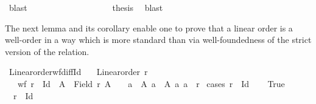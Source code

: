 \begin{isabellebody}
\ blast\isanewline
\ \ \ \ \ \ \isamarkupfalse%
\isanewline
\ \ \ \ \isamarkupfalse%
\isanewline
\ \ \isamarkupfalse%
\isanewline
\ \ \isamarkupfalse%
\ \isamarkupfalse%
\ {\isacharquery}{\kern0pt}thesis\ \isamarkupfalse%
\ blast\isanewline
{}\isamarkupfalse%
%
\endisatagproof
{\isafoldproof}%
%
\isadelimproof
%
\endisadelimproof
%
\isadelimdocument
%
\endisadelimdocument
%
\isatagdocument
%
\isamarkuptrue%
%
\endisatagdocument
{\isafolddocument}%
%
\isadelimdocument
%
\endisadelimdocument
%
\begin{isamarkuptext}%
The next lemma and its corollary enable one to prove that a linear order is
  a well-order in a way which is more standard than via well-foundedness of
  the strict version of the relation.%
\end{isamarkuptext}\isamarkuptrue%
\isamarkupfalse%
\ Linear{\isacharunderscore}{\kern0pt}order{\isacharunderscore}{\kern0pt}wf{\isacharunderscore}{\kern0pt}diff{\isacharunderscore}{\kern0pt}Id{\isacharcolon}{\kern0pt}\isanewline
\ \ \ {\isachardoublequoteopen}Linear{\isacharunderscore}{\kern0pt}order\ r{\isachardoublequoteclose}\isanewline
\ \ \ {\isachardoublequoteopen}wf\ {\isacharparenleft}{\kern0pt}r\ {\isacharminus}{\kern0pt}\ Id{\isacharparenright}{\kern0pt}\ {\isasymlongleftrightarrow}\ {\isacharparenleft}{\kern0pt}{\isasymforall}A\ {\isasymsubseteq}\ Field\ r{\isachardot}{\kern0pt}\ A\ {\isasymnoteq}\ {\isacharbraceleft}{\kern0pt}{\isacharbraceright}{\kern0pt}\ {\isasymlongrightarrow}\ {\isacharparenleft}{\kern0pt}{\isasymexists}a\ {\isasymin}\ A{\isachardot}{\kern0pt}\ {\isasymforall}a{\isacharprime}{\kern0pt}\ {\isasymin}\ A{\isachardot}{\kern0pt}\ {\isacharparenleft}{\kern0pt}a{\isacharcomma}{\kern0pt}\ a{\isacharprime}{\kern0pt}{\isacharparenright}{\kern0pt}\ {\isasymin}\ r{\isacharparenright}{\kern0pt}{\isacharparenright}{\kern0pt}{\isachardoublequoteclose}\isanewline
%
\isadelimproof
%
\endisadelimproof
%
\isatagproof
{}\isamarkupfalse%
\ {\isacharparenleft}{\kern0pt}cases\ {\isachardoublequoteopen}r\ {\isasymsubseteq}\ Id{\isachardoublequoteclose}{\isacharparenright}{\kern0pt}\isanewline
\ \ \isamarkupfalse%
\ True\isanewline
\ \ \isamarkupfalse%
\ \isamarkupfalse%
\ {\isacharasterisk}{\kern0pt}{\isacharcolon}{\kern0pt}\ {\isachardoublequoteopen}r\ {\isacharminus}{\kern0pt}\ Id\ {\isacharequal}{\kern0pt}\ {\isacharbraceleft}{\kern0pt}{\isacharbraceright}{\kern0pt}{\isachardoublequoteclose}\ \isamarkupfalse%

\end{isabellebody}
